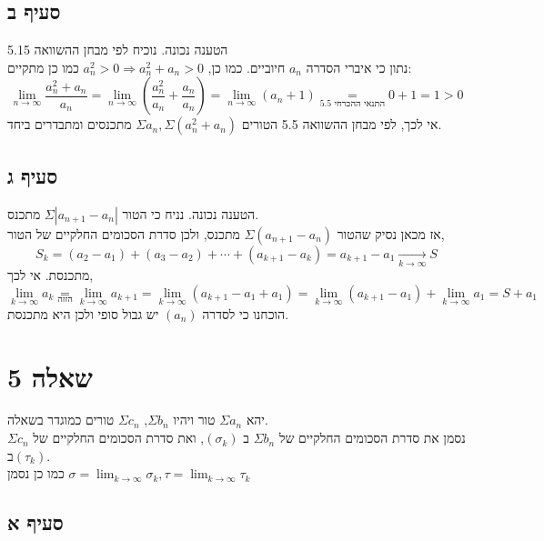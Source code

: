 \documentclass{article}
\newcommand\underrel[2]{\mathrel{\mathop{#2}\limits_{#1}}}
\begin{document}
\subsection*{סעיף ב}

הטענה נכונה. נוכיח לפי מבחן ההשוואה 5.15
\\
נתון כי איברי הסדרה $a_n$ חיוביים. כמו כן, $a_n^2>0\Rightarrow a_n^2+a_n>0$
כמו כן מתקיים:
\[
    \lim_{n\rightarrow \infty} \frac{a_n^2+a_n}{a_n}=
    \lim_{n\rightarrow \infty} \left(\frac{a_n^2}{a_n}+\frac{a_n}{a_n}\right)=
    \lim_{n\rightarrow \infty} (a_n+1) \underrel{\text{התנאי ההכרחי 5.5}}{=}
    0+1=1>0
\]
אי לכך, לפי מבחן ההשוואה 5.5 הטורים $\Sigma a_n, \Sigma (a_n^2+a_n)$ מתכנסים ומתבדרים ביחד.

\subsection*{סעיף ג}

הטענה נכונה. נניח כי הטור $\Sigma|a_{n+1}-a_n|$ מתכנס.  \\
אז מכאן נסיק שהטור $\Sigma(a_{n+1}-a_n)$ מתכנס,
ולכן סדרת הסכומים החלקיים של הטור,
\[
    S_k=(a_2-a_1)+(a_3-a_2)+\cdots+(a_{k+1}-a_k)=a_{k+1}-a_1 \xrightarrow[k\rightarrow\infty]{} S
\]
מתכנסת.
אי לכך,
\[
    \lim_{k\rightarrow \infty} a_k \underrel{\text{הזזה}}{=}
    \lim_{k\rightarrow \infty} a_{k+1} =
    \lim_{k\rightarrow \infty} (a_{k+1}-a_1+a_1) =
    \lim_{k\rightarrow \infty} (a_{k+1}-a_1) + \lim_{k\rightarrow \infty}a_1 =
    S+a_1
\]
הוכחנו כי לסדרה $(a_n)$ יש גבול סופי ולכן היא מתכנסת.

\pagebreak

\section*{שאלה 5}

יהא $\Sigma a_n$ טור ויהיו $\Sigma b_n$, $\Sigma c_n$ טורים כמוגדר בשאלה. \\
נסמן את סדרת הסכומים החלקיים של $\Sigma b_n$ ב $(\sigma_k)$, ואת סדרת הסכומים החלקיים של $\Sigma c_n$ ב$(\tau_k)$. \\
כמו כן נסמן $\sigma = \lim_{k\rightarrow \infty}\sigma_k, \tau = \lim_{k\rightarrow\infty}\tau_k$

\subsection*{סעיף א}
\end{document}
